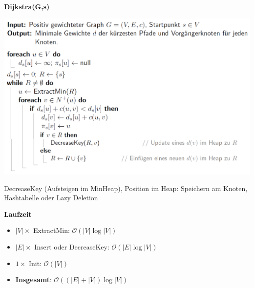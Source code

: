 \vspace{-4pt}
\begin{sectionbox}
\textbf{Dijkstra(G,s)}\par
\includegraphics[width = \columnwidth]{../img/Dijkstra.png}\par
DecreaseKey (Aufsteigen im MinHeap), Position im Heap: Speichern am Knoten, Hashtabelle oder Lazy Deletion\par\smallskip
\textbf{Laufzeit}\par
\begin{itemize}
    \item $|V| \times$ ExtractMin: $\mathcal{O}(|V| \log |V|)$
    \item $|E| \times$ Insert oder DecreaseKey: $\mathcal{O}(|E| \log |V|)$
    \item $1 \times$ Init: $\mathcal{O}(|V|)$
    \item \textbf{Insgesamt}: $\mathcal{O}((|E| + |V|)\log |V|)$
\end{itemize}

\end{sectionbox}
\vspace{-4pt}
